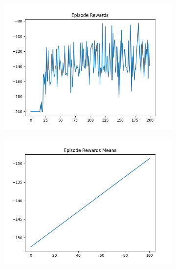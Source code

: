 \begin{figure}[H]
    \centering
    \begin{subfigure}{.47\linewidth}
        \centering
        \includegraphics[width=\textwidth]{mountain/2024-06-15_13-41-53_dqn_mountaincar_episode_rewards.png}
    \end{subfigure}
    \begin{subfigure}{.47\linewidth}
        \centering
        \includegraphics[width=\textwidth]{mountain/2024-06-15_13-41-53_dqn_mountaincar_episode_rewards_means.png}
    \end{subfigure}
    \begin{subfigure}{.47\linewidth}
        \centering

\end{subfigure}
\end{figure}
